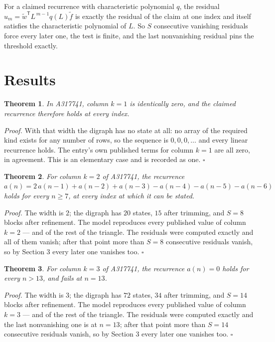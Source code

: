 \documentclass[11pt]{article}
\newtheorem{theorem}{Theorem}
\theoremstyle{definition}
\begin{document}
For a claimed recurrence with characteristic polynomial $q$, the residual $u_m = \tilde w^{\mathsf T}L^{\,m-1}q(L)\tilde f$ is exactly the residual of the claim at one index and itself satisfies the characteristic polynomial of $L$. So $S$ consecutive vanishing residuals force every later one, the test is finite, and the last nonvanishing residual pins the threshold exactly.

\section{Results}

\begin{theorem} In A317741, column $k = 1$ is identically zero, and the claimed recurrence therefore holds at every index.\end{theorem}

{\itshape Proof.} With that width the digraph has no state at all: no array of the required kind exists for any number of rows, so the sequence is $0,0,0,\dots$ and every linear recurrence holds. The entry's own published terms for column $k = 1$ are all zero, in agreement. This is an elementary case and is recorded as one. $\square$

\begin{theorem} For column $k = 2$ of A317741, the recurrence $a(n) = 2\,a(n-1) + a(n-2) + a(n-3) - a(n-4) - a(n-5) - a(n-6)$ holds for every $n \ge 7$, at every index at which it can be stated.\end{theorem}

{\itshape Proof.} The width is $2$; the digraph has $20$ states, $15$ after trimming, and $S = 8$ blocks after refinement. The model reproduces every published value of column $k = 2$ --- and of the rest of the triangle. The residuals were computed exactly and all of them vanish; after that point more than $S = 8$ consecutive residuals vanish, so by Section 3 every later one vanishes too. $\square$

\begin{theorem} For column $k = 3$ of A317741, the recurrence $a(n) = 0$ holds for every $n > 13$, and fails at $n = 13$.\end{theorem}

{\itshape Proof.} The width is $3$; the digraph has $72$ states, $34$ after trimming, and $S = 14$ blocks after refinement. The model reproduces every published value of column $k = 3$ --- and of the rest of the triangle. The residuals were computed exactly and the last nonvanishing one is at $n = 13$; after that point more than $S = 14$ consecutive residuals vanish, so by Section 3 every later one vanishes too. $\square$
\end{document}
